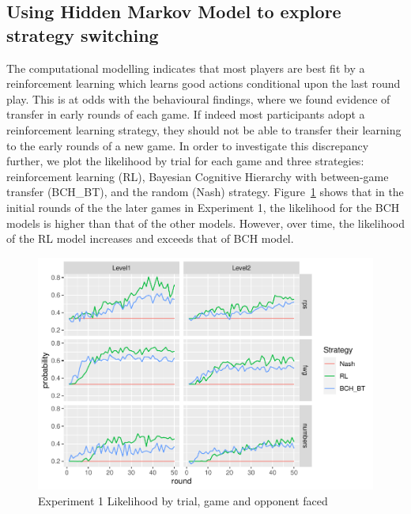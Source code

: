 \documentclass[man,floatsintext]{apa6}
\begin{document}
\hypertarget{using-hidden-markov-model-to-explore-strategy-switching}{%
\subsection{Using Hidden Markov Model to explore strategy switching}\label{using-hidden-markov-model-to-explore-strategy-switching}}

The computational modelling indicates that most players are best fit by a reinforcement learning which learns good actions conditional upon the last round play. This is at odds with the behavioural findings, where we found evidence of transfer in early rounds of each game. If indeed most participants adopt a reinforcement learning strategy, they should not be able to transfer their learning to the early rounds of a new game. In order to investigate this discrepancy further, we plot the likelihood by trial for each game and three strategies: reinforcement learning (RL), Bayesian Cognitive Hierarchy with between-game transfer (BCH\_BT), and the random (Nash) strategy. Figure~\ref{fig:exp1-lik-by-tr} shows that in the initial rounds of the the later games in Experiment 1, the likelihood for the BCH models is higher than that of the other models. However, over time, the likelihood of the RL model increases and exceeds that of BCH model.

\begin{figure}

{\centering \includegraphics{paper_draft_2021_files/figure-latex/exp1-lik-by-tr-1} 

}

\caption{Experiment 1 Likelihood by trial, game and opponent faced}\label{fig:exp1-lik-by-tr}
\end{figure}
\end{document}
